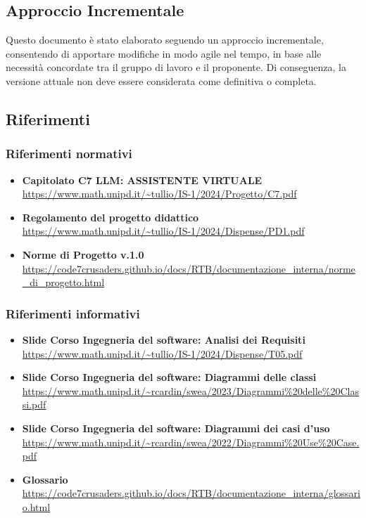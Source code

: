 \subsection{Approccio Incrementale}
Questo documento è stato elaborato seguendo un approccio incrementale, 
consentendo di apportare modifiche in modo agile nel tempo, 
in base alle necessità concordate tra il gruppo di lavoro e il proponente. Di conseguenza, 
la versione attuale non deve essere considerata come definitiva o completa.

\subsection{Riferimenti}
\subsubsection{Riferimenti normativi}
\begin{itemize}
    \item \textbf{Capitolato C7 LLM: ASSISTENTE VIRTUALE} \url{https://www.math.unipd.it/~tullio/IS-1/2024/Progetto/C7.pdf}
    \item \textbf{Regolamento del progetto didattico} \url{https://www.math.unipd.it/~tullio/IS-1/2024/Dispense/PD1.pdf}
    \item \textbf{Norme di Progetto v.1.0} \url{https://code7crusaders.github.io/docs/RTB/documentazione_interna/norme_di_progetto.html}
\end{itemize}

\subsubsection{Riferimenti informativi}
\begin{itemize}
    \item \textbf{Slide Corso Ingegneria del software: Analisi dei Requisiti} \url{https://www.math.unipd.it/~tullio/IS-1/2024/Dispense/T05.pdf}
    \item \textbf{Slide Corso Ingegneria del software: Diagrammi delle classi} \url{https://www.math.unipd.it/~rcardin/swea/2023/Diagrammi%20delle%20Classi.pdf}
    \item \textbf{Slide Corso Ingegneria del software: Diagrammi dei casi d'uso} \url{https://www.math.unipd.it/~rcardin/swea/2022/Diagrammi%20Use%20Case.pdf}
    \item \textbf{Glossario} \url{https://code7crusaders.github.io/docs/RTB/documentazione_interna/glossario.html}
\end{itemize}
